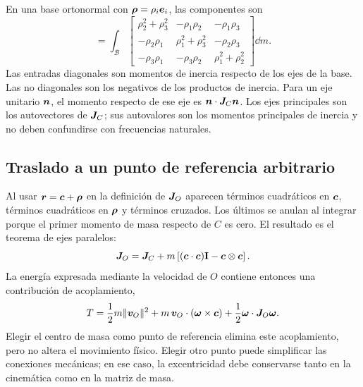En una base ortonormal con $\bm{\rho}=\rho_i\bm{e}_i$, las componentes son
\begin{equation}
 [\ten J_C]=\int_{\mathcal B}
 \begin{bmatrix}
 \rho_2^2+\rho_3^2&-\rho_1\rho_2&-\rho_1\rho_3\\
 -\rho_2\rho_1&\rho_1^2+\rho_3^2&-\rho_2\rho_3\\
 -\rho_3\rho_1&-\rho_3\rho_2&\rho_1^2+\rho_2^2
 \end{bmatrix}\dd m.
 \label{eq:J-componentes}
\end{equation}
Las entradas diagonales son momentos de inercia respecto de los ejes de la base. Las no diagonales son los negativos de los productos de inercia. Para un eje unitario $\bm{n}$, el momento respecto de ese eje es $\bm{n}\cdot\boldsymbol{J}_C\bm{n}$. Los ejes principales son los autovectores de $\boldsymbol{J}_C$; sus autovalores son los momentos principales de inercia y no deben confundirse con frecuencias naturales.

\subsection{Traslado a un punto de referencia arbitrario}
Al usar $\bm{r}=\bm{c}+\bm{\rho}$ en la definición de $\boldsymbol{J}_O$ aparecen términos cuadráticos en $\bm{c}$, términos cuadráticos en $\bm{\rho}$ y términos cruzados. Los últimos se anulan al integrar porque el primer momento de masa respecto de $C$ es cero. El resultado es el teorema de ejes paralelos:
\begin{equation}
 \boldsymbol{J}_O=\boldsymbol{J}_C+
 m\left[(\bm{c}\cdot\bm{c})\mathbf I-\bm{c}\otimes\bm{c}\right].
 \label{eq:Steiner-volumen}
\end{equation}
La energía expresada mediante la velocidad de $O$ contiene entonces una contribución de acoplamiento,
\begin{equation}
 T=\frac12m\|\bm{v}_O\|^2+
 m\,\bm{v}_O\cdot(\bm{\omega}\times\bm{c})
 +\frac12\bm{\omega}\cdot\boldsymbol{J}_O\bm{\omega}.
 \label{eq:T-origen}
\end{equation}
Elegir el centro de masa como punto de referencia elimina este acoplamiento, pero no altera el movimiento físico. Elegir otro punto puede simplificar las conexiones mecánicas; en ese caso, la excentricidad debe conservarse tanto en la cinemática como en la matriz de masa.

